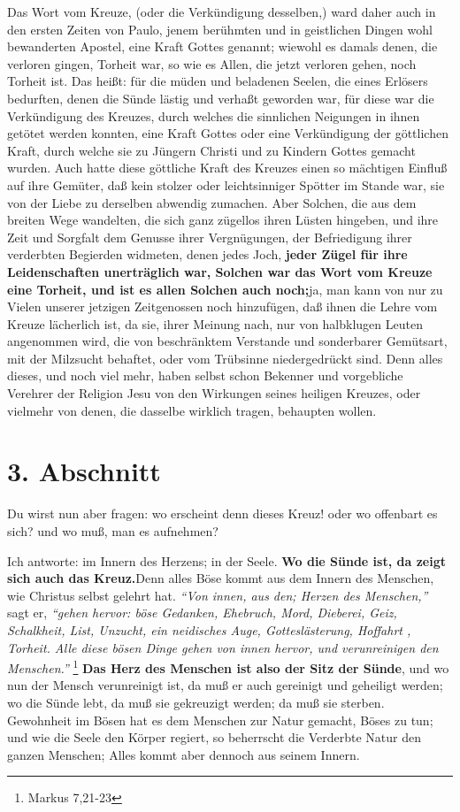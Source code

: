 Das Wort vom Kreuze, (oder die Verkündigung desselben,) ward daher auch in den
ersten Zeiten von Paulo, jenem berühmten und in geistlichen Dingen wohl
bewanderten Apostel, eine Kraft Gottes genannt; wiewohl es damals denen, die
verloren gingen, Torheit war, so wie es Allen, die jetzt verloren gehen, noch
Torheit ist. Das heißt: für die müden und beladenen Seelen, die eines Erlösers
bedurften, denen die Sünde lästig und verhaßt geworden war, für diese war die
Verkündigung des Kreuzes, durch welches die sinnlichen Neigungen in ihnen
getötet werden konnten, eine Kraft Gottes oder eine Verkündigung der göttlichen
Kraft, durch welche sie zu Jüngern Christi und zu Kindern Gottes gemacht wurden.
Auch hatte diese göttliche Kraft des Kreuzes einen so mächtigen Einfluß auf ihre
Gemüter, daß kein stolzer oder leichtsinniger Spötter im Stande war, sie von
der Liebe zu derselben abwendig zumachen. Aber Solchen, die aus dem breiten Wege
wandelten, die sich ganz zügellos ihren Lüsten hingeben, und ihre Zeit und
Sorgfalt dem Genusse ihrer Vergnügungen, der Befriedigung ihrer verderbten
Begierden widmeten, denen jedes Joch, \textbf{jeder Zügel für ihre Leidenschaften
unerträglich war, Solchen war das Wort vom Kreuze eine Torheit, und ist es
allen Solchen auch noch;}ja, man kann von nur zu Vielen unserer jetzigen
Zeitgenossen noch hinzufügen, daß ihnen die Lehre vom Kreuze lächerlich ist, da
sie, ihrer Meinung nach, nur von halbklugen Leuten angenommen wird, die von
beschränktem Verstande und sonderbarer Gemütsart, mit der Milzsucht%
 behaftet,
oder vom Trübsinne niedergedrückt sind. Denn alles dieses, und noch viel mehr,
haben selbst schon Bekenner und vorgebliche Verehrer der Religion Jesu von den
Wirkungen seines heiligen Kreuzes, oder vielmehr von denen, die dasselbe
wirklich tragen, behaupten wollen.

\section{3. Abschnitt} \label{kap3_ab3} 

Du wirst nun aber fragen: wo erscheint denn dieses Kreuz! oder wo offenbart es
sich? und wo muß, man es aufnehmen?

Ich antworte: im Innern des Herzens; in der Seele. \textbf{Wo die Sünde ist, da zeigt
sich auch das Kreuz.}Denn alles Böse kommt aus dem Innern des Menschen, wie
Christus selbst gelehrt hat.
\textit{"`Von innen, aus den; Herzen des Menschen,"'} sagt er,
\textit{"`gehen hervor: böse Gedanken, Ehebruch, Mord, Dieberei, Geiz, Schalkheit,
List, Unzucht, ein neidisches Auge, Gotteslästerung, Hoffahrt%
, Torheit. Alle
diese bösen Dinge gehen von innen hervor, und verunreinigen den
Menschen."'}
\footnote{Markus 7,21-23}
\textbf{Das Herz des Menschen ist also der Sitz der Sünde},
 und wo nun der Mensch
verunreinigt ist, da muß er auch gereinigt und
geheiligt werden; wo die Sünde lebt, da muß sie gekreuzigt werden; da muß sie
sterben. Gewohnheit im Bösen hat es dem Menschen zur Natur gemacht, Böses zu
tun; und wie die Seele den Körper regiert, so beherrscht die Verderbte Natur
den ganzen Menschen; Alles kommt aber dennoch aus seinem Innern.

